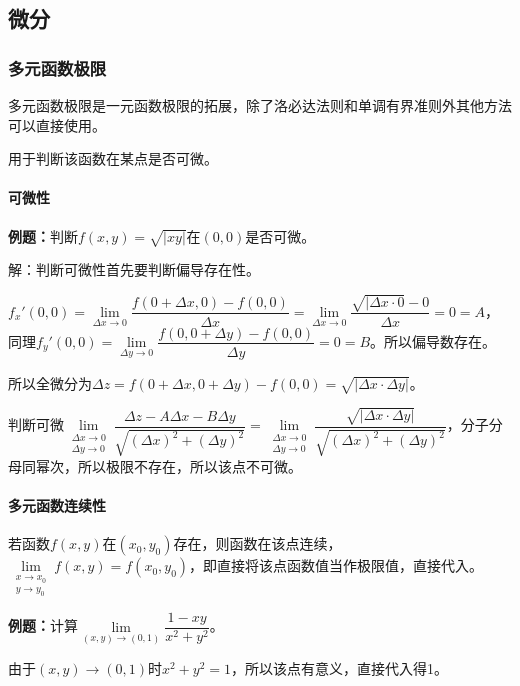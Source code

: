 \documentclass[UTF8, 12pt]{ctexart}
\begin{document}
\subsection{微分}

\subsubsection{多元函数极限}

多元函数极限是一元函数极限的拓展，除了洛必达法则和单调有界准则外其他方法可以直接使用。

用于判断该函数在某点是否可微。

\paragraph{可微性} \leavevmode \medskip

\textbf{例题：}判断$f(x,y)=\sqrt{\vert xy\vert}$在$(0,0)$是否可微。

解：判断可微性首先要判断偏导存在性。

$f_x'(0,0)=\lim\limits_{\Delta x\to0}\dfrac{f(0+\Delta x,0)-f(0,0)}{\Delta x}=\lim\limits_{\Delta x\to0}\dfrac{\sqrt{\vert\Delta x\cdot 0}-0}{\Delta x}=0=A$，同理$f_y'(0,0)=\lim\limits_{\Delta y\to0}\dfrac{f(0,0+\Delta y)-f(0,0)}{\Delta y}=0=B$。所以偏导数存在。

所以全微分为$\Delta z=f(0+\Delta x,0+\Delta y)-f(0,0)=\sqrt{\vert\Delta x\cdot\Delta y\vert}$。

判断可微$\lim\limits_{\substack{\Delta x\to0\\\Delta y\to0}}\dfrac{\Delta z-A\Delta x-B\Delta y}{\sqrt{(\Delta x)^2+(\Delta y)^2}}=\lim\limits_{\substack{\Delta x\to0\\\Delta y\to0}}\dfrac{\sqrt{\vert\Delta x\cdot\Delta y\vert}}{\sqrt{(\Delta x)^2+(\Delta y)^2}}$，分子分母同幂次，所以极限不存在，所以该点不可微。

\paragraph{多元函数连续性} \leavevmode \medskip

若函数$f(x,y)$在$(x_0,y_0)$存在，则函数在该点连续，$\lim\limits_{\substack{x\to x_0\\ y\to y_0}}f(x,y)=f(x_0,y_0)$，即直接将该点函数值当作极限值，直接代入。

\textbf{例题：}计算$\lim\limits_{(x,y)\to(0,1)}\dfrac{1-xy}{x^2+y^2}$。

由于$(x,y)\to(0,1)$时$x^2+y^2=1$，所以该点有意义，直接代入得1。
\end{document}
